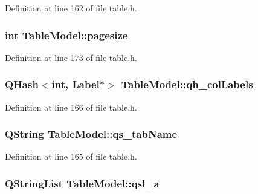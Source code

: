 Definition at line 162 of file table.h.

\hypertarget{classTableModel_ab9dfb638330390087383eb9373c3d419}{
\subsubsection[{pagesize}]{\setlength{\rightskip}{0pt plus 5cm}int {\bf TableModel::pagesize}}}
\label{classTableModel_ab9dfb638330390087383eb9373c3d419}


Definition at line 173 of file table.h.

\hypertarget{classTableModel_a5a5e432aac68a716c4bf1849d821a846}{
\subsubsection[{qh\_\-colLabels}]{\setlength{\rightskip}{0pt plus 5cm}QHash$<$int, {\bf Label}$\ast$$>$ {\bf TableModel::qh\_\-colLabels}}}
\label{classTableModel_a5a5e432aac68a716c4bf1849d821a846}


Definition at line 166 of file table.h.

\hypertarget{classTableModel_a3cf9e7d2a7d75f156247d572df42d669}{
\subsubsection[{qs\_\-tabName}]{\setlength{\rightskip}{0pt plus 5cm}QString {\bf TableModel::qs\_\-tabName}}}
\label{classTableModel_a3cf9e7d2a7d75f156247d572df42d669}


Definition at line 165 of file table.h.

\hypertarget{classTableModel_ae2d3fd99f245025a7078671bb8b42225}{
\subsubsection[{qsl\_\-a}]{\setlength{\rightskip}{0pt plus 5cm}QStringList {\bf TableModel::qsl\_\-a}}}
\label{classTableModel_ae2d3fd99f245025a7078671bb8b42225}



